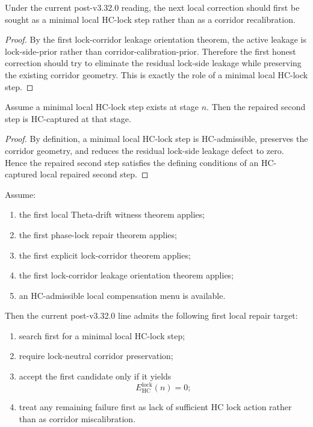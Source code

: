 \begin{proposition}
\label{prop:the-current-line-calls-first-for-a-minimal-hc-lock-step}
Under the current post-v3.32.0 reading, the next local correction should first be sought as a minimal local HC-lock step rather than as a corridor recalibration.
\end{proposition}

\begin{proof}
By the first lock-corridor leakage orientation theorem, the active leakage is lock-side-prior rather than corridor-calibration-prior. Therefore the first honest correction should try to eliminate the residual lock-side leakage while preserving the existing corridor geometry. This is exactly the role of a minimal local HC-lock step.
\end{proof}

\begin{lemma}
\label{lem:minimal-hc-lock-step-implies-hc-capture}
Assume a minimal local HC-lock step exists at stage $n$. Then the repaired second step is HC-captured at that stage.
\end{lemma}

\begin{proof}
By definition, a minimal local HC-lock step is HC-admissible, preserves the corridor geometry, and reduces the residual lock-side leakage defect to zero. Hence the repaired second step satisfies the defining conditions of an HC-captured local repaired second step.
\end{proof}

\begin{theorem}
\label{thm:first-minimal-hc-lock-step-theorem}
Assume:
\begin{enumerate}[leftmargin=2em,label=(\alph*)]
  \item the first local Theta-drift witness theorem applies;
  \item the first phase-lock repair theorem applies;
  \item the first explicit lock-corridor theorem applies;
  \item the first lock-corridor leakage orientation theorem applies;
  \item an HC-admissible local compensation menu is available.
\end{enumerate}
Then the current post-v3.32.0 line admits the following first local repair target:
\begin{enumerate}[leftmargin=2em,label=(\roman*)]
  \item search first for a minimal local HC-lock step;
  \item require lock-neutral corridor preservation;
  \item accept the first candidate only if it yields
  \[
    E_{\mathrm{HC}}^{\mathrm{lock}}(n)=0;
  \]
  \item treat any remaining failure first as lack of sufficient HC lock action rather than as corridor miscalibration.
\end{enumerate}
\end{theorem}

